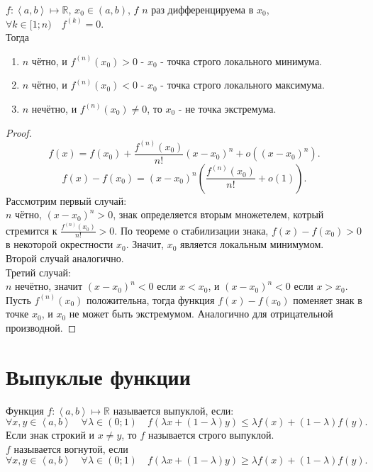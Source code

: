 \documentclass[11pt, oneside]{article}   	%
\begin{document}
    \begin{theorem}
        $f: \left<a, b\right> \mapsto \mathbb{R}$, $x_0\in (a, b)$, $f$ $n$ раз дифференцируема в $x_0$, $\forall{k\in [1; n)}\quad f^{(k)} = 0$.\\
        Тогда
        \begin{enumerate}
            \item $n$ чётно, и $f^{(n)}(x_0) > 0$ - $x_0$ - точка строго локального минимума.
            \item $n$ чётно, и $f^{(n)}(x_0) < 0$ - $x_0$ - точка строго локального максимума.
            \item $n$ нечётно, и $f^{(n)}(x_0) \neq  0$, то $x_0$ - не точка экстремума.
        \end{enumerate}
        \begin{proof}
            \[ f(x) = f(x_0) + \frac{f^{(n)}(x_0)}{n!}(x-x_0)^{n} + o((x-x_0)^{n}) .\]
            \[ f(x) - f(x_0) = (x-x_0)^{n}\left( \frac{f^{(n)}(x_0)}{n!} + o(1) \right)  .\] 
            Рассмотрим первый случай:\\
            $n$ чётно, $(x-x_0)^{n}>0$, знак определяется вторым множетелем, котрый стремится к $\frac{f^{(n)}(x_0)}{n!}>0$. По теореме о стабилизации знака, $f(x)-f(x_0)>0$ в некоторой окрестности $x_0$. Значит, $x_0$ является локальным минимумом.\\
            Второй случай аналогично.\\
            Третий случай:\\
            $n$ нечётно, значит $(x-x_0)^{n} < 0$ если $x<x_0$, и $(x-x_0)^{n}<0$ если $x>x_0$.\\
            Пусть $f^{(n)}(x_0)$ положительна, тогда функция $f(x)-f(x_0)$ поменяет знак в точке $x_0$, и $x_0$ не может быть экстремумом. Аналогично для отрицательной производной.
        \end{proof}
    \end{theorem}
\section{Выпуклые функции}
    \begin{definition}
        Функция $f: \left<a, b\right> \mapsto \mathbb{R}$ называется выпуклой, если:
        \[ \forall{x, y\in \left<a, b\right>}\quad \forall{\lambda\in (0; 1)}\quad f(\lambda x + (1-\lambda)y) \le \lambda f(x) + (1-\lambda)f(y) .\]
        Если знак строкий и $x\neq y$, то $f$ называется строго выпуклой.\\
        $f$ называется вогнутой, если 
        \[ \forall{x,y\in \left<a, b\right>}\quad \forall{\lambda\in (0; 1)}\quad f(\lambda x + (1-\lambda)y) \ge \lambda f(x) + (1-\lambda)f(y) .\]

    \end{definition}
\end{document}
